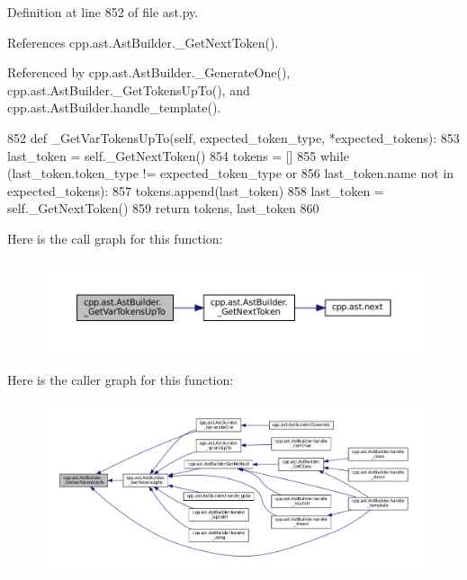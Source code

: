 Definition at line 852 of file ast.\+py.



References cpp.\+ast.\+Ast\+Builder.\+\_\+\+Get\+Next\+Token().



Referenced by cpp.\+ast.\+Ast\+Builder.\+\_\+\+Generate\+One(), cpp.\+ast.\+Ast\+Builder.\+\_\+\+Get\+Tokens\+Up\+To(), and cpp.\+ast.\+Ast\+Builder.\+handle\+\_\+template().


\begin{DoxyCode}
852     \textcolor{keyword}{def }\_GetVarTokensUpTo(self, expected\_token\_type, *expected\_tokens):
853         last\_token = self.\_GetNextToken()
854         tokens = []
855         \textcolor{keywordflow}{while} (last\_token.token\_type != expected\_token\_type \textcolor{keywordflow}{or}
856                last\_token.name \textcolor{keywordflow}{not} \textcolor{keywordflow}{in} expected\_tokens):
857             tokens.append(last\_token)
858             last\_token = self.\_GetNextToken()
859         \textcolor{keywordflow}{return} tokens, last\_token
860 
\end{DoxyCode}
Here is the call graph for this function\+:
\nopagebreak
\begin{figure}[H]
\begin{center}
\leavevmode
\includegraphics[width=350pt]{classcpp_1_1ast_1_1AstBuilder_a0b5b10f2608ba3e8851fbd65d51b1f22_cgraph}
\end{center}
\end{figure}
Here is the caller graph for this function\+:
\nopagebreak
\begin{figure}[H]
\begin{center}
\leavevmode
\includegraphics[width=350pt]{classcpp_1_1ast_1_1AstBuilder_a0b5b10f2608ba3e8851fbd65d51b1f22_icgraph}
\end{center}
\end{figure}
\mbox{\label{classcpp_1_1ast_1_1AstBuilder_affc78a722f3038f6384147512fa8ef89}} 
